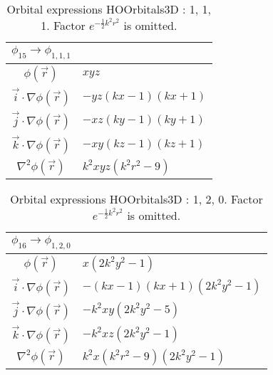 \begin{table}
\begin{center}
\begin{tabular}{c|l}
$\phi_{15} \rightarrow \phi_{1, 1, 1}$\\
\hline
$\phi(\vec r)$ & $x y z$\\
\hline
$\vec i\cdot \nabla \phi(\vec r)$ & $- y z \left(k x -1\right) \left(k x + 1\right)$\\
$\vec j\cdot \nabla \phi(\vec r)$ & $- x z \left(k y -1\right) \left(k y + 1\right)$\\
$\vec k\cdot \nabla \phi(\vec r)$ & $- x y \left(k z -1\right) \left(k z + 1\right)$\\
\hline
$\nabla^2 \phi(\vec r)$ & $k^{2} x y z \left(k^{2} r^{2} -9\right)$\\
\end{tabular}
\caption{Orbital expressions HOOrbitals3D : 1, 1, 1. Factor $e^{- \frac{1}{2} k^{2} r^{2}}$ is omitted.}
\end{center}
\end{table}


\begin{table}
\begin{center}
\begin{tabular}{c|l}
$\phi_{16} \rightarrow \phi_{1, 2, 0}$\\
\hline
$\phi(\vec r)$ & $x \left(2 k^{2} y^{2} -1\right)$\\
\hline
$\vec i\cdot \nabla \phi(\vec r)$ & $- \left(k x -1\right) \left(k x + 1\right) \left(2 k^{2} y^{2} -1\right)$\\
$\vec j\cdot \nabla \phi(\vec r)$ & $- k^{2} x y \left(2 k^{2} y^{2} -5\right)$\\
$\vec k\cdot \nabla \phi(\vec r)$ & $- k^{2} x z \left(2 k^{2} y^{2} -1\right)$\\
\hline
$\nabla^2 \phi(\vec r)$ & $k^{2} x \left(k^{2} r^{2} -9\right) \left(2 k^{2} y^{2} -1\right)$\\
\end{tabular}
\caption{Orbital expressions HOOrbitals3D : 1, 2, 0. Factor $e^{- \frac{1}{2} k^{2} r^{2}}$ is omitted.}
\end{center}
\end{table}


